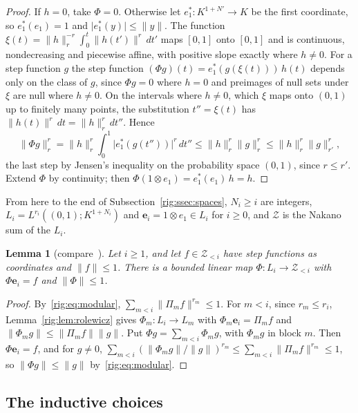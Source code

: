 \documentclass[11pt]{amsart}
\newtheorem{lemma}[theorem]{Lemma}
\theoremstyle{definition}
\theoremstyle{remark}
\numberwithin{equation}{section}
\newcommand{\abs}[1]{\lvert #1\rvert}
\newcommand{\norm}[1]{\lVert #1\rVert}
\theoremstyle{plain}
\theoremstyle{definition}
\theoremstyle{plain}
\begin{document}
\begin{proof}
If $h=0$, take $\Phi=0$. Otherwise let $e^*_1\colon K^{1+N'}\to K$ be the first coordinate, so $e^*_1(e_1)=1$ and
$\abs{e^*_1(y)}\le\norm y$. The function $\xi(t)=\norm h_r^{-r}\int_0^t\norm{h(t')}^r\,dt'$ maps $[0,1]$ onto $[0,1]$
and is continuous, nondecreasing and piecewise affine, with positive slope exactly where $h\ne0$. For a step function
$g$ the step function $(\Phi g)(t)=e^*_1(g(\xi(t)))\,h(t)$ depends only on the class of $g$, since $\Phi g=0$ where
$h=0$ and preimages of null sets under $\xi$ are null where $h\ne0$. On the intervals where $h\ne0$, which $\xi$ maps
onto $(0,1)$ up to finitely many points, the substitution $t''=\xi(t)$ has $\norm{h(t)}^r\,dt=\norm h_r^r\,dt''$. Hence
\[
 \norm{\Phi g}_r^r=\norm h_r^r\int_0^1\abs{e^*_1(g(t''))}^r\,dt''\le\norm h_r^r\norm g_r^r\le\norm h_r^r\norm g_{r'}^r,
\]
the last step by Jensen's inequality on the probability space $(0,1)$, since $r\le r'$. Extend $\Phi$ by continuity;
then $\Phi(1\otimes e_1)=e^*_1(e_1)\,h=h$.
\end{proof}

From here to the end of Subsection~\ref{rig:ssec:spaces}, $N_i\ge i$ are integers, $L_i=L^{r_i}((0,1);K^{1+N_i})$ and
$\mathbf e_i=1\otimes e_1\in L_i$ for $i\ge0$, and $\mathcal Z$ is the Nakano sum of the $L_i$.

\begin{lemma}[compare~{\cite[Lemma~3.2]{KR}}]\label{rig:lem:onto-earlier}
Let $i\ge1$, and let $f\in\mathcal Z_{<i}$ have step functions as coordinates and $\norm f\le1$. There is a bounded
linear map $\Phi\colon L_i\to\mathcal Z_{<i}$ with $\Phi\mathbf e_i=f$ and $\norm\Phi\le1$.
\end{lemma}

\begin{proof}
By~\eqref{rig:eq:modular}, $\sum_{m<i}\norm{\Pi_mf}^{r_m}\le1$. For $m<i$, since $r_m\le r_i$,
Lemma~\ref{rig:lem:rolewicz} gives $\Phi_m\colon L_i\to L_m$ with $\Phi_m\mathbf e_i=\Pi_mf$ and
$\norm{\Phi_mg}\le\norm{\Pi_mf}\norm g$. Put $\Phi g=\sum_{m<i}\Phi_mg$, with $\Phi_mg$ in block $m$. Then
$\Phi\mathbf e_i=f$, and for $g\ne0$, $\sum_{m<i}(\norm{\Phi_mg}/\norm g)^{r_m}\le\sum_{m<i}\norm{\Pi_mf}^{r_m}\le1$, so
$\norm{\Phi g}\le\norm g$ by~\eqref{rig:eq:modular}.
\end{proof}

\subsection{The inductive choices}\label{rig:ssec:choices}
\end{document}
